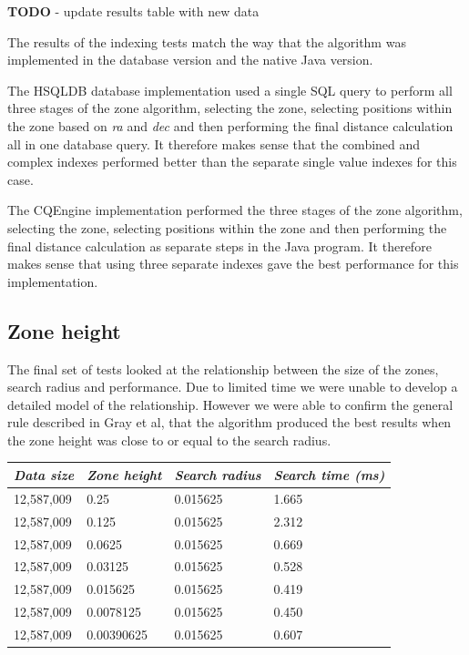 \documentclass{article}
\newcommand{\hsqldb} {HSQLDB\xspace}
\newcommand{\cqengine} {CQEngine\xspace}
\begin{document}
\textbf{TODO} - update results table with new data

The results of the indexing tests match the way that the algorithm was implemented in the database version and the native Java version.

The \hsqldb database implementation used a single SQL query to perform all three stages of the zone algorithm, selecting the zone, selecting positions within the zone based on \textit{ra} and \textit{dec} and then performing the final distance calculation all in one database query. It therefore makes sense that the combined and complex indexes performed better than the separate single value indexes for this case.

The \cqengine implementation performed the three stages of the zone algorithm, selecting the zone, selecting positions within the zone and then performing the final distance calculation as separate steps in the Java program.  It therefore makes sense that using three separate indexes gave the best performance for this implementation.

\subsection{Zone height}
\label{zone-height}

The final set of tests looked at the relationship between the size of the zones, search radius and performance. Due to limited time we were unable to develop a detailed model of the relationship. However we were able to confirm the general rule described in Gray et al, that the algorithm produced the best results when the zone height was close to or equal to the search radius. 

\begin{table}[h]
\centering
\begin{tabular}{|l|l|l|l|}
\hline
\textit{Data size} & \textit{Zone height} & \textit{Search radius} & \textit{Search time (ms)} \\ \hline
12,587,009 & 0.25       & 0.015625 & 1.665 \\ \hline
12,587,009 & 0.125      & 0.015625 & 2.312 \\ \hline
12,587,009 & 0.0625     & 0.015625 & 0.669 \\ \hline
12,587,009 & 0.03125    & 0.015625 & 0.528 \\ \hline
12,587,009 & 0.015625   & 0.015625 & 0.419 \\ \hline
12,587,009 & 0.0078125  & 0.015625 & 0.450 \\ \hline
12,587,009 & 0.00390625 & 0.015625 & 0.607 \\ \hline
\end{tabular}
\end{table}
\end{document}

